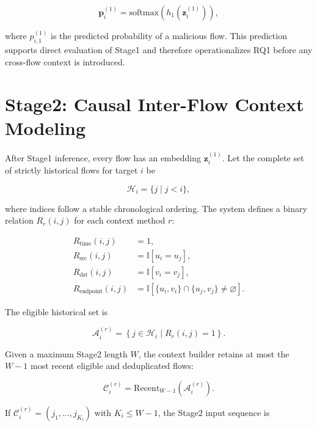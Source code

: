 \documentclass[11pt,fleqn]{report}
\begin{document}
\begin{equation}
\mathbf{p}^{(1)}_i
=
\mathrm{softmax}
\left(
    h_1(\mathbf{z}^{(1)}_i)
\right),
\end{equation}

where $p^{(1)}_{i,1}$ is the predicted probability of a malicious flow. This
prediction supports direct evaluation of Stage1 and therefore operationalizes
RQ1 before any cross-flow context is introduced.

\section{Stage2: Causal Inter-Flow Context Modeling}
\label{subsec:stage2_formulation}

After Stage1 inference, every flow has an embedding
$\mathbf{z}^{(1)}_i$. Let the complete set of strictly historical flows for
target $i$ be

\begin{equation}
\mathcal{H}_i=\{j\mid j<i\},
\end{equation}

where indices follow a stable chronological ordering. The system defines a
binary relation $R_r(i,j)$ for each context method $r$:

\begin{align}
R_{\mathrm{time}}(i,j)
&=1,\\
R_{\mathrm{src}}(i,j)
&=\mathbb{I}[u_i=u_j],\\
R_{\mathrm{dst}}(i,j)
&=\mathbb{I}[v_i=v_j],\\
R_{\mathrm{endpoint}}(i,j)
&=\mathbb{I}
\left[
    \{u_i,v_i\}\cap\{u_j,v_j\}\neq\varnothing
\right].
\end{align}

The eligible historical set is

\begin{equation}
\mathcal{A}^{(r)}_i
=
\left\{
    j\in\mathcal{H}_i
    \mid
    R_r(i,j)=1
\right\}.
\end{equation}

Given a maximum Stage2 length $W$, the context builder retains at most the
$W-1$ most recent eligible and deduplicated flows:

\begin{equation}
\mathcal{C}^{(r)}_i
=
\mathrm{Recent}_{W-1}
\left(
    \mathcal{A}^{(r)}_i
\right).
\label{eq:context_set}
\end{equation}

If
$\mathcal{C}^{(r)}_i=(j_1,\ldots,j_{K_i})$ with $K_i\leq W-1$, the Stage2 input
sequence is
\end{document}
